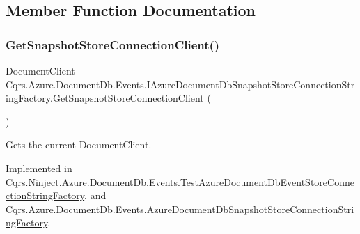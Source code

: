 \subsection{Member Function Documentation}
\mbox{\label{interfaceCqrs_1_1Azure_1_1DocumentDb_1_1Events_1_1IAzureDocumentDbSnapshotStoreConnectionStringFactory_ad28e9645fa8039eede157719e4d026b3_ad28e9645fa8039eede157719e4d026b3}} 
\subsubsection{\texorpdfstring{Get\+Snapshot\+Store\+Connection\+Client()}{GetSnapshotStoreConnectionClient()}}
{\footnotesize\ttfamily Document\+Client Cqrs.\+Azure.\+Document\+Db.\+Events.\+I\+Azure\+Document\+Db\+Snapshot\+Store\+Connection\+String\+Factory.\+Get\+Snapshot\+Store\+Connection\+Client (\begin{DoxyParamCaption}{ }\end{DoxyParamCaption})}



Gets the current Document\+Client. 



Implemented in \hyperlink{classCqrs_1_1Ninject_1_1Azure_1_1DocumentDb_1_1Events_1_1TestAzureDocumentDbEventStoreConnectionStringFactory_a637c31a89b1514543a736b63f3213eaf_a637c31a89b1514543a736b63f3213eaf}{Cqrs.\+Ninject.\+Azure.\+Document\+Db.\+Events.\+Test\+Azure\+Document\+Db\+Event\+Store\+Connection\+String\+Factory}, and \hyperlink{classCqrs_1_1Azure_1_1DocumentDb_1_1Events_1_1AzureDocumentDbSnapshotStoreConnectionStringFactory_a7dfd66f2b187f61b2581e72be408a15d_a7dfd66f2b187f61b2581e72be408a15d}{Cqrs.\+Azure.\+Document\+Db.\+Events.\+Azure\+Document\+Db\+Snapshot\+Store\+Connection\+String\+Factory}.

